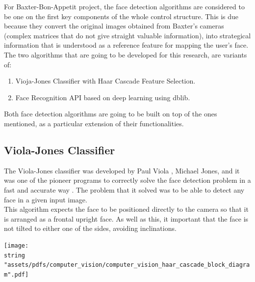 \documentclass[11pt]{report} %
\begin{document}
For Baxter-Bon-Appetit project, the face detection algorithms are considered to be one on the first key components of the whole control structure. This is due because they convert the original images obtained from Baxter's cameras (complex matrices that do not give straight valuable information), into strategical information that is understood as a reference feature for mapping the user's face.\\

The two algorithms that are going to be developed for this research, are variants of:

\begin{enumerate}
    \item Vioja-Jones Classifier with Haar Cascade Feature Selection.
    \item Face Recognition API based on deep learning using dblib.
\end{enumerate}

Both face detection algorithms are going to be built on top of the ones mentioned, as a particular extension of their functionalities.\\

\subsection{Viola-Jones Classifier}
\label{sec:viola_jones_classifier}

The Viola-Jones classifier was developed by Paul Viola , Michael Jones, and it was one of the pioneer programs to correctly solve the face detection problem in a fast and accurate way \citep{cite_viola_jones_face_detection_algorithm}. The problem that it solved was to be able to detect any face in a given input image.\\

This algorithm expects the face to be positioned directly to the camera so that it is arranged as a frontal upright face. As well as this, it important that the face is not tilted to either one of the sides, avoiding inclinations.\\

\begin{center}
\texttt{[image: \\string "assets/pdfs/computer\_vision/computer\_vision\_haar\_cascade\_block\_diagram".pdf]}
\bigbreak
\begin{minipage}{\linewidth} %
\label{fig_computer_vision_block_diagram_haar_cascade}
\end{minipage} \end{center}
\end{document}
